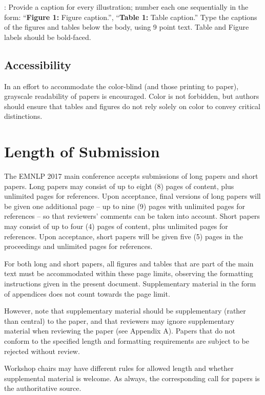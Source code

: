 : Provide a caption for every illustration; number each one
sequentially in the form:  ``{\bf Figure 1:} Figure caption.'',
``{\bf Table 1:} Table caption.''  Type the captions of the figures and tables
below the body, using 9 point text. Table and Figure labels should be
bold-faced.

\subsection{Accessibility}
\label{ssec:accessibility}

In an effort to accommodate the color-blind (and those printing to paper),
grayscale readability of papers is encouraged. Color is not forbidden, but 
authors should ensure that tables and figures do not rely solely on color to
convey critical distinctions.

\section{Length of Submission}
\label{sec:length}

The EMNLP 2017 main conference accepts submissions of long papers and short papers. Long papers may consist of up to eight (8) pages of content, plus unlimited pages for references. Upon acceptance, final versions of long papers will be given one additional page – up to nine (9) pages with unlimited pages for references – so that reviewers’ comments can be taken into account. Short papers may consist of up to four (4) pages of content, plus unlimited pages for references. Upon acceptance, short papers will be given five (5) pages in the proceedings and unlimited pages for references. 

For both long and short papers, all figures and tables that are part of the main text must be accommodated within these page limits, observing the formatting instructions given in the present document. Supplementary material in the form of appendices does not count towards the page limit.

However, note that supplementary material should be supplementary (rather than central) to the paper, and that reviewers may ignore supplementary material when reviewing the paper (see Appendix A). Papers that do not conform to the specified length and formatting requirements are subject to be rejected without review.

Workshop chairs may have different rules for allowed length and whether supplemental material is welcome.  As always, the corresponding call for papers is the authoritative source.

